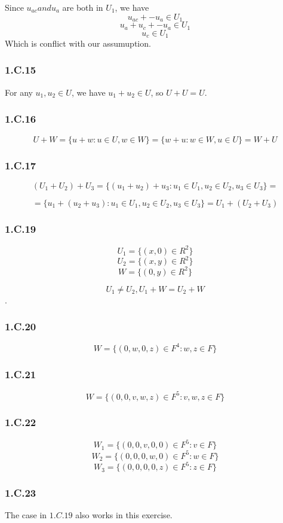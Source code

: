 Since $u_{ac} and u_{a}$ are both in $U_{1}$, we have
\[u_{ac} + -u_{a} \in U_{1}\]
\[u_{a} + u_{c} + -u_{a} \in U_{1}\]
\[u_{c} \in U_{1}\]
Which is conflict with our assumuption.

\subsubsection*{1.C.15}

For any $u_{1}, u_{2} \in U$, we have $u_{1} + u_{2} \in U$, so $U+U=U$.

\subsubsection*{1.C.16}
\[U + W = \{u + w:u \in U, w \in W\} = \{w + u: w\in W, u\in U\} = W + U\]

\subsubsection*{1.C.17}
\[(U_{1} + U_{2}) + U_{3} = \{(u_{1} + u_{2}) + u_{3}: u_{1} \in U_{1}, u_{2} \in U_{2}, u_{3} \in U_{3}\} = \]

\[= \{u_{1} + (u_{2} + u_{3}): u_{1} \in U_{1}, u_{2} \in U_{2}, u_{3} \in U_{3}\} = U_{1} + (U_{2} + U_{3})\]

\subsubsection*{1.C.19}
\[U_{1} = \{(x, 0) \in R^{2}\}\]
\[U_{2} = \{(x, y) \in R^{2}\}\]
\[W = \{(0, y) \in R^{2}\}\]

\[U_{1} \neq U_{2}, U_{1}+W = U_{2}+W\].

\subsubsection*{1.C.20}

\[W = \{(0, w, 0, z) \in F^{4}: w, z\in F\}\]

\subsubsection*{1.C.21}
\[W = \{(0, 0, v, w, z) \in F^{5}: v,w,z \in F\}\]

\subsubsection*{1.C.22}
\[W_{1} = \{(0, 0, v, 0,0) \in F^{5}: v \in F\} \]
\[W_{2} = \{(0, 0, 0, w, 0) \in F^{5}: w \in F\}\]
\[W_{3} = \{(0, 0, 0, 0, z) \in F^{5}: z \in F\}\]

\subsubsection*{1.C.23}

The case in $1.C.19$ also works in this exercise.


\newpage